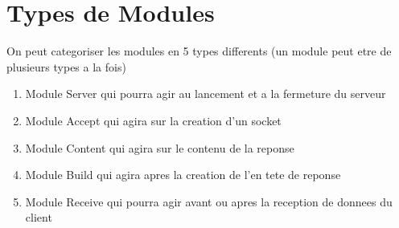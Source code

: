   \chapter{Types de Modules}
    On peut categoriser les modules en 5 types differents (un module peut etre de plusieurs types a la fois)
    \begin{enumerate}
        \item   Module Server qui pourra agir au lancement et a la fermeture du serveur
        \item   Module Accept qui agira sur la creation d'un socket
        \item   Module Content qui agira sur le contenu de la reponse
        \item   Module Build qui agira apres la creation de l'en tete de reponse
        \item   Module Receive qui pourra agir avant ou apres la reception de donnees du client
    \end{enumerate}

